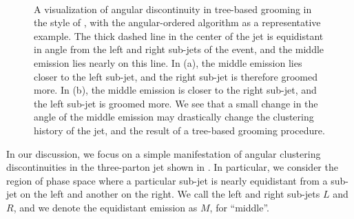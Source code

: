 \begin{figure}[t!]
      \centering
      ~~~~
      \caption[A visualization of angular discontinuity in tree-based grooming.]{
    A visualization of angular discontinuity in tree-based grooming in the style of , with the angular-ordered  algorithm as a representative example.
    The thick dashed line in the center of the jet is equidistant in angle from the left and right sub-jets of the event, and the middle emission lies nearly on this line.
    In (a), the middle emission lies closer to the left sub-jet, and the right sub-jet is therefore groomed more.
    In (b), the middle emission is closer to the right sub-jet, and the left sub-jet is groomed more.
    We see that a small change in the angle of the middle emission may drastically change the clustering history of the jet, and the result of a tree-based grooming procedure.
}
\label{fig:angdiscont}
\end{figure}


In our discussion, we focus on a simple manifestation of angular clustering discontinuities in the three-parton jet shown in .
%
In particular, we consider the region of phase space where a particular sub-jet is nearly equidistant from a sub-jet on the left and another on the right.
%
We call the left and right sub-jets \(L\) and \(R\), and we denote the equidistant emission as \(M\), for ``middle''.

